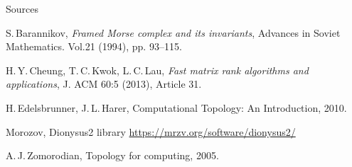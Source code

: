 \documentclass[10pt,xcolor={usenames}]{beamer}
\begin{document}
\begin{frame}{Sources}

\begin{thebibliography}{12}

 S.\,Barannikov, \textit{Framed Morse complex and its invariants}, Advances in Soviet Mathematics. Vol.21 (1994), pp. 93--115.

 H.\,Y.\,Cheung, T.\,C.\,Kwok, L.\,C.\,Lau, \textit{Fast matrix rank algorithms and applications}, J. ACM 60:5 (2013), Article 31.

 H.\,Edelsbrunner, J.\,L.\,Harer, Computational Topology: An Introduction, 2010.

 Morozov, Dionysus2 library \href{https://mrzv.org/software/dionysus2/}{https://mrzv.org/software/dionysus2/}

 A.\,J.\,Zomorodian, Topology for computing, 2005.

\end{thebibliography}

\end{frame}

%
%
%
%
\end{document}
